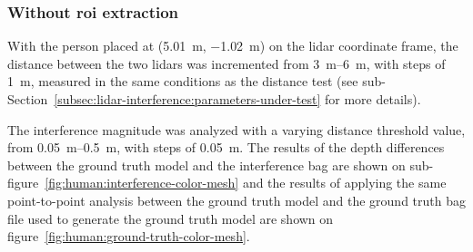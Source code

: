 \subsubsection{Without \ac{roi} extraction}
With the person placed at (\SI{5.01}{\meter}, \SI{-1.02}{\meter}) on the \ac{lidar} coordinate frame, the distance between the two \acp{lidar} was incremented from \SIrange{3}{6}{\meter}, with steps of \SI{1}{\meter}, measured in the same conditions as the distance test (see sub-Section~\ref{subsec:lidar-interference:parameters-under-test} for more details). 

The interference magnitude was analyzed with a varying distance threshold value, from \SIrange{0.05}{0.5}{\meter}, with steps of \SI{0.05}{\meter}. The results of the depth differences between the ground truth model and the interference bag are shown on sub-figure~\ref{fig:human:interference-color-mesh} and the results of applying the same point-to-point analysis between the ground truth model and the ground truth bag file used to generate the ground truth model are shown on figure~\ref{fig:human:ground-truth-color-mesh}.

